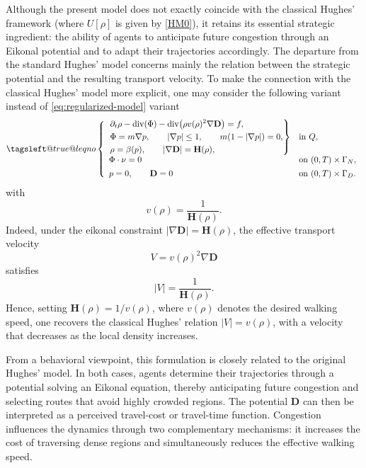 \documentclass[final,reqno]{amsart}
\makeatletter
\theoremstyle{plain}
\theoremstyle{definition}
\theoremstyle{remark}
\numberwithin{remark}{section}	%
\numberwithin{example}{section}	%
\DeclareMathOperator{\dive}{div}
\newcommand{\de}{\mathbf{D}}
\newcommand{\he}{\mathbf{H}}
\newcommand{\leqnomode}{\tagsleft@true\let\veqno\@@leqno}
\makeatother
\begin{document}
Although the present model does not exactly coincide with the classical Hughes' framework (where $U[\rho]$ is given by \eqref{HM0}), it retains its essential strategic ingredient: the ability of agents to anticipate future congestion through an Eikonal potential and to adapt their trajectories accordingly. The departure from the standard Hughes' model concerns mainly the relation between the strategic potential and the resulting transport velocity.
 To make the connection with the classical Hughes' model more explicit, one may consider the following variant instead of \eqref{eq:regularized-model} variant
\begin{equation}\leqnomode
   \label{eq:regularized-model1}
    \left\{
    \begin{array}{ll}
        \left. \begin{aligned}
            &\partial_t \rho - \dive(\Phi)-\dive\!\big(\rho v(\rho)^2\nabla \de\big)=f,\\
            &\Phi=m\nabla p,\qquad |\nabla p|\leq 1,\qquad m(1-|\nabla p|)=0,\\
            &\rho=\beta(p),\qquad |\nabla \de|=\he(\rho),
        \end{aligned}\right\}
        & \text{in } Q,\\[3ex]
        \Phi\cdot\nu=0
        & \text{on } (0,T)\times\Gamma_N,\\[1ex]
        p=0,\qquad \de=0
        & \text{on } (0,T)\times\Gamma_D.
    \end{array}
    \right.
\end{equation}
with
$$v(\rho)=\frac{1}{\he(\rho) }.$$
Indeed, under the eikonal constraint $|\nabla \de|=\he(\rho)$, the effective transport velocity
 $$V=v(\rho)^2 \nabla \de$$
 satisfies
 $$|V|=\frac{1}{\he(\rho)}. $$
Hence, setting $\he(\rho)=1/v(\rho)$, where $v(\rho)$ denotes the desired walking speed, one recovers the classical Hughes' relation $|V|=v(\rho)$, with a velocity that decreases as the local density increases.

From a behavioral viewpoint, this formulation is closely related to the original Hughes' model. In both cases, agents determine their trajectories through a potential solving an Eikonal equation, thereby anticipating future congestion and selecting routes that avoid highly crowded regions. The potential $\de$ can then be interpreted as a perceived travel-cost or travel-time function. Congestion influences the dynamics through two complementary mechanisms: it increases the cost of traversing dense regions and simultaneously reduces the effective walking speed.
\end{document}
